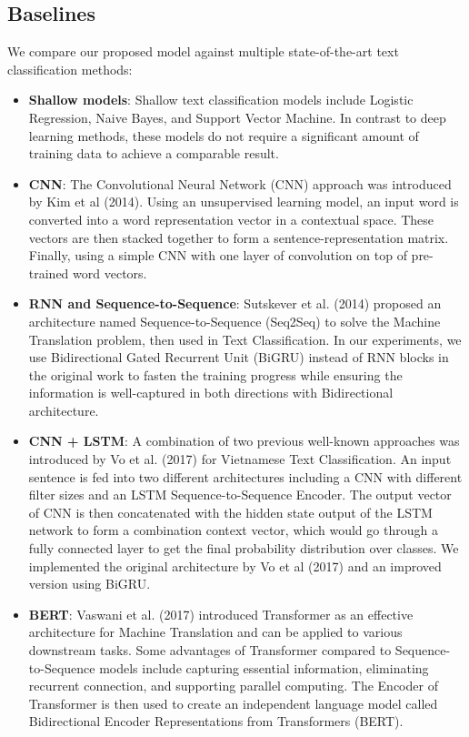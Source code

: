 \documentclass[sn-mathphys,Numbered]{sn-jnl}%
\theoremstyle{thmstyleone}%
\theoremstyle{thmstyletwo}%
\theoremstyle{thmstylethree}%
\begin{document}
\subsection{Baselines}
We compare our proposed model against multiple state-of-the-art text classification methods:
\begin{itemize}
\item \textbf{Shallow models}: Shallow text classification models include Logistic Regression, Naive Bayes, and Support Vector Machine. In contrast to deep learning methods, these models do not require a significant amount of training data to achieve a comparable result.
\item \textbf{CNN}: The Convolutional Neural Network (CNN) approach was introduced by Kim et al (2014)\cite{Kim2014}. Using an unsupervised learning model, an input word is converted into a word representation vector in a contextual space. These vectors are then stacked together to form a sentence-representation matrix. Finally, using a simple CNN with one layer of convolution on top of pre-trained word vectors.
\item \textbf{RNN and Sequence-to-Sequence}: Sutskever et al. (2014)\cite{Sutskever2014} proposed an architecture named Sequence-to-Sequence (Seq2Seq) to solve the Machine Translation problem, then used in Text Classification. In our experiments, we use Bidirectional Gated Recurrent Unit (BiGRU)\cite{Cho2014-GRU} instead of RNN blocks in the original work to fasten the training progress while ensuring the information is well-captured in both directions with Bidirectional architecture.
\item \textbf{CNN + LSTM}: A combination of two previous well-known approaches was introduced by Vo et al. (2017)\cite{Vo2017} for Vietnamese Text Classification. An input sentence is fed into two different architectures including a CNN with different filter sizes and an LSTM Sequence-to-Sequence Encoder. The output vector of CNN is then concatenated with the hidden state output of the LSTM network to form a combination context vector, which would go through a fully connected layer to get the final probability distribution over classes. We implemented the original architecture by Vo et al (2017) and an improved version using BiGRU.
\item \textbf{BERT}: Vaswani et al. (2017)\cite{Vaswani2017} introduced Transformer as an effective architecture for Machine Translation and can be applied to various downstream tasks. Some advantages of Transformer compared to Sequence-to-Sequence models include capturing essential information, eliminating recurrent connection, and supporting parallel computing. The Encoder of Transformer is then used to create an independent language model called Bidirectional Encoder Representations from Transformers (BERT)\cite{Devlin2019}.

\end{itemize}
\end{document}
